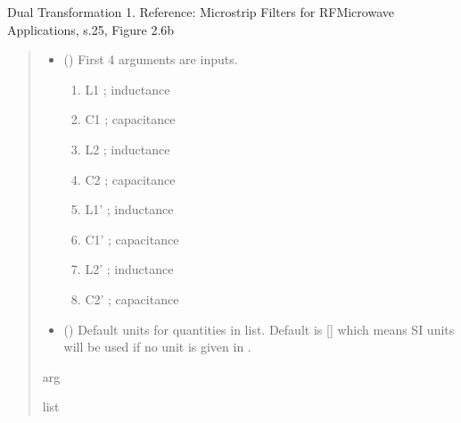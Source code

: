 \documentclass[letterpaper,10pt,english]{sphinxmanual}
\begin{document}

\begin{fulllineitems}
\label{\detokenize{components:components.DualTransformation2}}
\pysigstartsignatures
{}
\pysigstopsignatures
\sphinxAtStartPar
Dual Transformation 1.
Reference:  Microstrip Filters for RF\sphinxhyphen{}Microwave Applications, s.25, Figure 2.6b
\begin{quote}\begin{description}
\begin{itemize}
\item {} 
\sphinxAtStartPar
{} () \textendash{} 
\sphinxAtStartPar
First 4 arguments are inputs.
\begin{enumerate}
%
\item {} 
\sphinxAtStartPar
L1 ; inductance

\item {} 
\sphinxAtStartPar
C1 ; capacitance

\item {} 
\sphinxAtStartPar
L2 ; inductance

\item {} 
\sphinxAtStartPar
C2 ; capacitance

\item {} 
\sphinxAtStartPar
L1’ ; inductance

\item {} 
\sphinxAtStartPar
C1’ ; capacitance

\item {} 
\sphinxAtStartPar
L2’ ; inductance

\item {} 
\sphinxAtStartPar
C2’ ; capacitance

\end{enumerate}


\item {} 
\sphinxAtStartPar
{} (\sphinxstyleliteralemphasis{\sphinxupquote{, }}) \textendash{} Default units for quantities in  list. Default is {[}{]} which means SI units will be used if no unit is given in .

\end{itemize}

\sphinxAtStartPar
arg

\sphinxAtStartPar
list

\end{description}\end{quote}

\end{fulllineitems}
\end{document}
